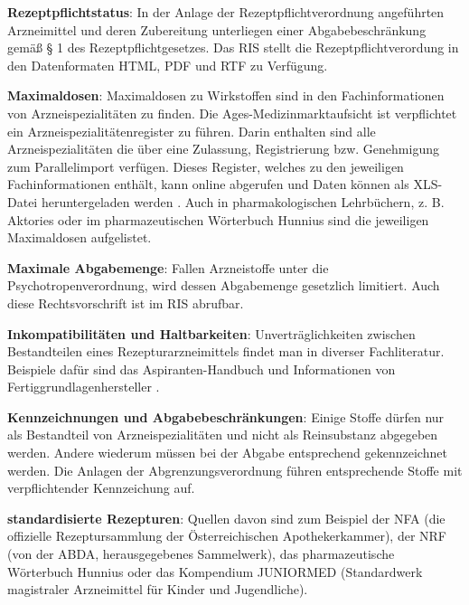 \documentclass[12pt,a4paper]{article}
\begin{document}
\textbf{Rezeptpflichtstatus}: In der Anlage der Rezeptpflichtverordnung angeführten Arzneimittel und deren Zubereitung unterliegen einer Abgabebeschränkung gemäß § 1 des Rezeptpflichtgesetzes.
Das \ac{RIS} stellt die Rezeptpflichtverordung in den Datenformaten HTML, PDF und RTF zu Verfügung. 


\textbf{Maximaldosen}: Maximaldosen zu Wirkstoffen sind in den Fachinformationen von Arzneispezialitäten zu finden. Die Ages-Medizinmarktaufsicht ist verpflichtet ein Arzneispezialitätenregister zu führen. Darin enthalten sind alle Arzneispezialitäten die über eine Zulassung, Registrierung bzw. Genehmigung zum Parallelimport verfügen. Dieses Register, welches  zu den jeweiligen Fachinformationen enthält, kann online abgerufen und Daten können als XLS-Datei heruntergeladen werden \cite{.22.03.2022b}. Auch in pharmakologischen Lehrbüchern, z. B. Aktories oder im pharmazeutischen Wörterbuch Hunnius sind die jeweiligen Maximaldosen aufgelistet. 

\textbf{Maximale Abgabemenge}: Fallen Arzneistoffe unter die Psychotropenverordnung, wird dessen Abgabemenge gesetzlich limitiert. Auch diese Rechtsvorschrift ist im \ac{RIS} abrufbar. 


\textbf{Inkompatibilitäten und Haltbarkeiten}: Unverträglichkeiten zwischen Bestandteilen eines Rezepturarzneimittels findet man in diverser Fachliteratur. Beispiele dafür sind das Aspiranten-Handbuch und Informationen von Fertiggrundlagenhersteller \cite{Ichthyol.22.03.2022,.22.03.2022b}.

\textbf{Kennzeichnungen und Abgabebeschränkungen}: Einige Stoffe dürfen nur als Bestandteil von Arzneispezialitäten und nicht als Reinsubstanz abgegeben werden. Andere wiederum müssen bei der Abgabe entsprechend gekennzeichnet werden. Die Anlagen der Abgrenzungsverordnung führen entsprechende Stoffe mit verpflichtender Kennzeichung auf. 

\textbf{standardisierte Rezepturen}: Quellen davon sind zum Beispiel der \ac{NFA} (die offizielle Rezeptursammlung der Österreichischen Apothekerkammer), der \ac{NRF} (von der \ac{ABDA}, herausgegebenes Sammelwerk), das pharmazeutische Wörterbuch Hunnius oder das Kompendium JUNIORMED (Standardwerk magistraler Arzneimittel für Kinder und Jugendliche).
\end{document}
